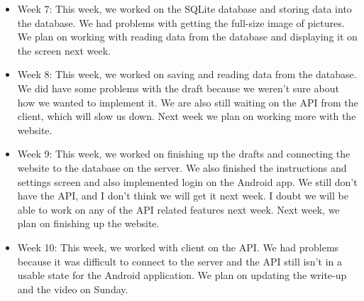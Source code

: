 \documentclass[onecolumn, draftclsnofoot,10pt, compsoc]{IEEEtran}
\begin{document}
\begin{itemize}
     \item Week 7: This week, we worked on the SQLite database and storing data into the database. We had problems with getting the full-size image of pictures. We plan on working with reading data from the database and displaying it on the screen next week.
     
     \item Week 8: This week, we worked on saving and reading data from the database. We did have some problems with the draft because we weren't sure about how we wanted to implement it. We are also still waiting on the API from the client, which will slow us down. Next week we plan on working more with the website.
     
     \item Week 9: This week, we worked on finishing up the drafts and connecting the website to the database on the server. We also finished the instructions and settings screen and also implemented login on the Android app. We still don't have the API, and I don't think we will get it next week. I doubt we will be able to work on any of the API related features next week. Next week, we plan on finishing up the website.
     
     \item Week 10: This week, we worked with client on the API. We had problems because it was difficult to connect to the server and the API still isn't in a usable state for the Android application. We plan on updating the write-up and the video on Sunday.
 \end{itemize}
\end{document}
